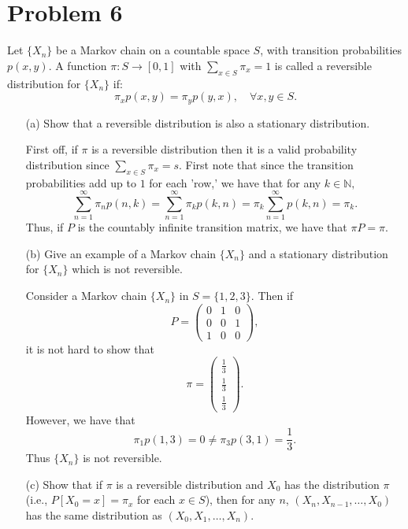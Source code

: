 \documentclass[11pt]{article}
\newcommand{\bbN}{\mathbb{N}}
\begin{document}
\section*{Problem 6}
\begin{problem}
 Let \(\{X_n\}\) be a Markov chain on a countable space \(S\), with transition probabilities \(p(x,y)\). A function \(\pi : S \to [0,1]\) with \(\sum_{x \in S} \pi_x = 1\) is called a reversible distribution for \(\{X_n\}\) if:
\[
\pi_x p(x,y) = \pi_y p(y,x), \quad \forall x, y \in S.
\]

\begin{enumerate}
    \item[(a)] Show that a reversible distribution is also a stationary distribution.
\begin{solution}
    First off, if $\pi$ is a reversible distribution then it is a valid probability distribution since $\sum_{x\in S}\pi_x = s.$ First note that since the transition probabilities add up to $1$ for each 'row,' we have that for any $k \in \bbN,$ 
    \[\sum_{n=1}^\infty \pi_n p(n,k)= \sum_{n=1}^\infty \pi_k p(k,n) = \pi_k \sum_{n=1}^\infty p(k,n) = \pi_k.\] Thus, if $P$ is the countably infinite transition matrix, we have that $\pi P  = \pi.$ 
\end{solution}
    \item[(b)] Give an example of a Markov chain \(\{X_n\}\) and a stationary distribution for \(\{X_n\}\) which is not reversible.
\begin{solution}
    Consider a Markov chain $\{X_n\}$ in $S = \{1,2,3\}.$ Then if 
    \[P = \begin{pmatrix}
        0 & 1 & 0 \\
        0 & 0 & 1\\
        1 & 0 & 0
    \end{pmatrix},\] it is not hard to show that 
    \[\pi = \begin{pmatrix}
        \frac{1}{3}\\
        \frac{1}{3}\\
        \frac{1}{3}
    \end{pmatrix}.\] However, we have that 
    \[\pi_1 p(1,3) = 0\neq \pi_3p(3,1) =\frac{1}{3}.\] Thus $\{X_n\}$ is not reversible. 
\end{solution}
    \item[(c)] Show that if \(\pi\) is a reversible distribution and \(X_0\) has the distribution \(\pi\) (i.e., \(P[X_0 = x] = \pi_x\) for each \(x \in S\)), then for any \(n\), \((X_n, X_{n-1}, \ldots, X_0)\) has the same distribution as \((X_0, X_1, \ldots, X_n)\). 

\end{enumerate}
\end{problem}
\end{document}
